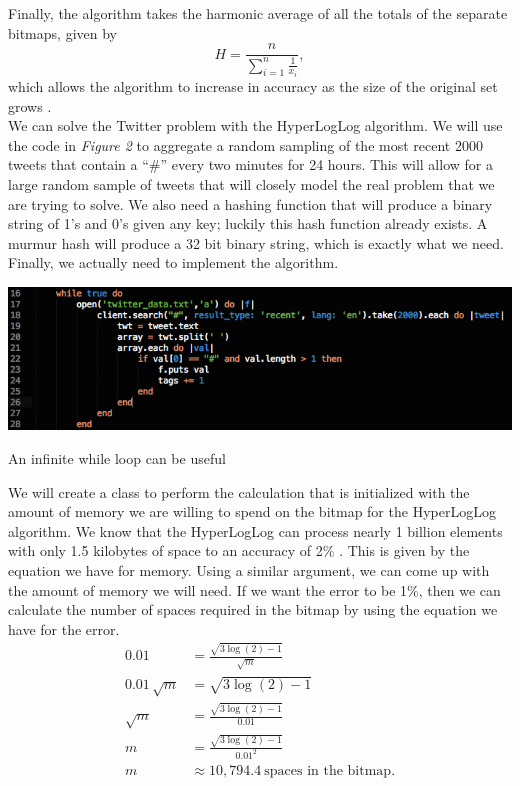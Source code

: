 \documentclass{article}
\begin{document}
Finally, the algorithm takes the harmonic average of all the totals of the separate bitmaps, given by
\[
H = \frac{n}{\sum_{i=1}^{n}\frac{1}{x_{i}}},
\] 
which allows the algorithm to increase in accuracy as the size of the original set grows \cite{Yousra}.\\
\indent We can solve the Twitter problem with the HyperLogLog algorithm.
We will use the code in \textit{Figure 2} to aggregate a random sampling of the most recent 2000 tweets that contain a ``\#'' every two minutes for 24 hours.
This will allow for a large random sample of tweets that will closely model the real problem that we are trying to solve. 
We also need a hashing function that will produce a binary string of 1's and 0's given any key; luckily this hash function already exists. A murmur hash will produce a 32 bit binary string, which is exactly what we need.
Finally, we actually need to implement the algorithm. 
\begin{floatingfigure}[hr]{8cm}
\centering
\begin{framed}
\includegraphics[scale=0.3]{twitter_problem/ruby_code_01}
\caption{An infinite while loop can be useful}
\end{framed}
\end{floatingfigure}
We will create a class to perform the calculation that is initialized with the amount of memory we are willing to spend on the bitmap for the HyperLogLog algorithm. 
\noindent We know that the HyperLogLog can process nearly 1 billion elements with only 1.5 kilobytes of space to an accuracy of 2\% \cite{Flaj}.\clearpage
This is given by the equation we have for memory.
Using a similar argument, we can come up with the amount of memory we will need. 
If we want the error to be 1\%, then we can calculate the number of spaces required in the bitmap by using the equation we have for the error.
\begin{align*}
0.01 &= \frac{\sqrt{3\log{(2)} - 1}}{\sqrt{m}}\\
0.01\,\sqrt{m} &= \sqrt{3\log{(2)} - 1}\\
\sqrt{m}\, &= \frac{\sqrt{3\log{(2)} - 1}}{0.01}\\
m &= \frac{\sqrt{3\log{(2)} - 1}}{0.01^{2}}\\
m &\approx 10,794.4\ \text{spaces in the bitmap}.
\end{align*}
\end{document}
